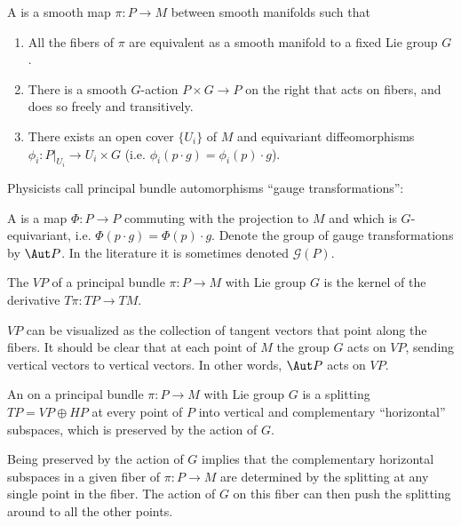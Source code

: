\begin{mydef}
A  is a smooth map \( \pi:P\to M \) between smooth manifolds such that
\begin{enumerate}
\item All the fibers of \( \pi \) are equivalent as a smooth manifold to a fixed Lie group \( G \).
\item There is a smooth \( G \)-action \( P\times G\to P \) on the right that acts on fibers, and does so freely and transitively.
\item There exists an open cover \( \{U_i\} \) of \( M \) and equivariant diffeomorphisms \( \phi_i:P|_{U_i}\to U_i\times G \) (i.e. \( \phi_i(p\cdot g)= \phi_i(p)\cdot g\)).
\end{enumerate}
\end{mydef}

Physicists call principal bundle automorphisms ``gauge transformations'':

\begin{mydef}
A  is a map \( \Phi:P\to P \) commuting with the projection to \( M \) and which is \( G \)-equivariant, i.e. \( \Phi(p\cdot g) = \Phi(p)\cdot g \). Denote the group of gauge transformations by \( \Aut P \). In the literature it is sometimes denoted \( \mathscr{G}(P) \).
\end{mydef}

\begin{mydef}
The  \( VP \) of a principal bundle \( \pi:P\to M \) with Lie group \( G \) is the kernel of the derivative \( T\pi:TP\to TM \).
\end{mydef}

\( VP \) can be visualized as the collection of tangent vectors that point along the fibers. It should be clear that at each point of \( M \) the group \( G \) acts on \( VP \), sending vertical vectors to vertical vectors. In other words, \( \Aut P \) acts on \( VP \).

\begin{mydef}
An  on a principal bundle \( \pi:P\to M \) with Lie group \( G \) is a splitting \( TP=VP\oplus HP \) at every point of \( P \) into vertical and complementary ``horizontal'' subspaces, which is preserved by the action of \( G \).
\end{mydef}

Being preserved by the action of \( G \) implies that the complementary horizontal subspaces in a given fiber of \( \pi:P\to M \) are determined by the splitting at any single point in the fiber. The action of \( G \) on this fiber can then push the splitting around to all the other points.

